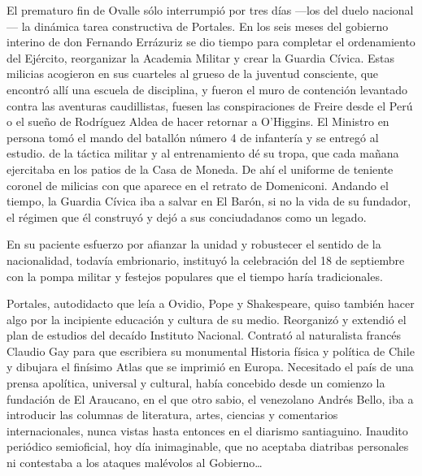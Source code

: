 \documentclass[10pt,twoside,openright]{memoir}
\begin{document}
 El prematuro fin de Ovalle sólo
interrumpió por tres días ---los del duelo nacional--- la dinámica tarea
constructiva de Portales. En los seis meses del gobierno interino de don
Fernando Errázuriz se dio tiempo para completar el ordenamiento del
Ejército, reorganizar la Academia Militar y crear la Guardia
 Cívica. Estas milicias acogieron en
sus cuarteles al grueso de la juventud consciente, que encontró allí una
escuela de disciplina, y fueron el muro de contención levantado contra
las aventuras caudillistas, fuesen las conspiraciones de Freire desde el
Perú o el sueño de Rodríguez Aldea de hacer retornar a O'Higgins. El
Ministro en persona tomó el mando del batallón número 4 de infantería y
se entregó al estudio. de la táctica militar y al entrenamiento dé su
tropa, que cada mañana ejercitaba en los patios de la Casa de Moneda. De
ahí el uniforme de teniente coronel de milicias con que aparece en el
retrato de Domeniconi. Andando el tiempo, la Guardia Cívica iba a salvar
en El Barón, si no la vida de su fundador, el régimen que él construyó y
dejó a sus conciudadanos como un legado.

En su paciente esfuerzo por afianzar la unidad y robustecer el sentido
de la nacionalidad, todavía embrionario, instituyó la celebración del 18
de septiembre con la pompa militar y festejos populares que el tiempo
haría tradicionales.

Portales, autodidacto que leía a Ovidio, Pope y Shakespeare, quiso
también hacer algo por la incipiente educación y cultura de su medio.
Reorganizó y extendió el plan de estudios del decaído Instituto
Nacional. Contrató al naturalista francés Claudio Gay
 para que escribiera su monumental
Historia física y política de Chile y dibujara el finísimo Atlas que se
imprimió en Europa. Necesitado el país de una prensa apolítica,
universal y cultural, había concebido
desde un comienzo la fundación de El
Araucano, en el que otro sabio, el venezolano Andrés Bello, iba a
introducir las columnas de literatura, artes, ciencias y comentarios
internacionales, nunca vistas hasta entonces en el diarismo santiaguino.
Inaudito periódico semioficial, hoy día inimaginable, que no aceptaba
diatribas personales ni contestaba a los ataques malévolos al
Gobierno\ldots
\end{document}
